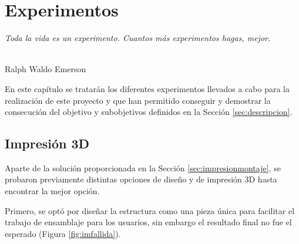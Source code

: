 \chapter{Experimentos}
\label{cap:capitulo7}

\begin{flushright}
\begin{minipage}[]{10cm}
\emph{Toda la vida es un experimento. Cuantos más experimentos hagas, mejor.}\\
\end{minipage}\\

Ralph Waldo Emerson\\
\end{flushright}

\vspace{1cm}

\setcounter{footnote}{117} %

En este capítulo se tratarán los diferentes experimentos llevados a cabo para la realización de este proyecto y que han permitido conseguir y demostrar la consecución del objetivo y subobjetivos definidos en la Sección \ref{sec:descripcion}.

\section{Impresión 3D}
\label{sec:expimpresion3d}
Aparte de la solución proporcionada en la Sección \ref{sec:impresionmontaje}, se probaron previamente distintas opciones de diseño y de impresión 3D hasta encontrar la mejor opción.

Primero, se optó por diseñar la estructura como una pieza única para facilitar el trabajo de ensamblaje para los usuarios, sin embargo el resultado final no fue el esperado (Figura \ref{fig:imfallida}). 

